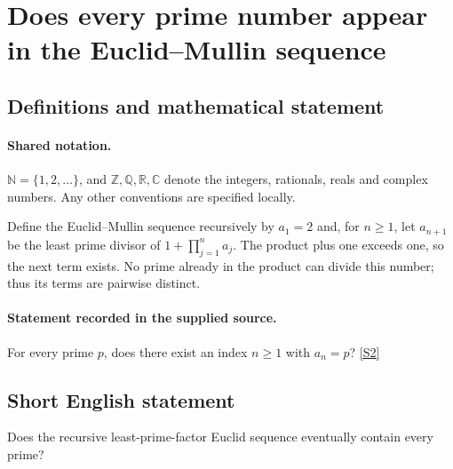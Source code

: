 \documentclass[11pt]{article}
\newcommand{\sref}[2]{\hyperlink{source:#1:#2}{[S#2]}}
\begin{document}
\section{Does every prime number appear in the Euclid–Mullin sequence}\label{statement}

\subsection{Definitions and mathematical statement}

\paragraph{Shared notation.}$\mathbb N=\{1,2,\ldots\}$, and $\mathbb Z,\mathbb Q,\mathbb R,\mathbb C$ denote the integers, rationals, reals and complex numbers. Any other conventions are specified locally.


Define the Euclid--Mullin sequence recursively by $a_1=2$ and, for $n\ge1$, let $a_{n+1}$ be the least prime divisor of $1+\prod_{j=1}^n a_j$. The product plus one exceeds one, so the next term exists. No prime already in the product can divide this number; thus its terms are pairwise distinct.
\paragraph{Statement recorded in the supplied source.}
For every prime $p$, does there exist an index $n\ge1$ with $a_n=p$? \sref{statement}{2}
\subsection{Short English statement}
Does the recursive least-prime-factor Euclid sequence eventually contain every prime?
\end{document}

